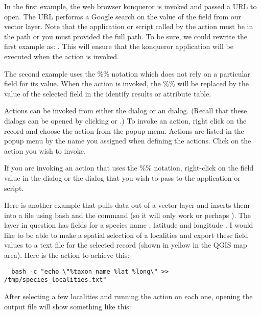 In the first example, the web browser konqueror is invoked and passed a URL to
open. The URL performs a Google search on the value of the  field
from our vector layer. Note that the application or script called by the
action must be in the path or you must provided the full path. To be sure, we could
rewrite the first example as: . This will ensure that the konqueror
application will be executed when the action is invoked.

The second example uses the \%\% notation which does not rely on a particular
field for its value. When the action is invoked, the \%\% will be replaced by
the value of the selected field in the identify results or attribute table.

\label{label_usingactions}

Actions can be invoked from either the  dialog or an
 dialog. (Recall that these dialogs can be opened by
clicking  or
.) To invoke an action,
right click on the record and choose the action from the popup menu. Actions
are listed in the popup menu by the name you assigned when defining the
actions. Click on the action you wish to invoke.

If you are invoking an action that uses the \%\% notation, right-click on the
field value in the  dialog or the
 dialog that you wish to pass to the application or script.

Here is another example that pulls data out of a vector layer and inserts them
into a file using bash and the  command (so it will only work
\nix or perhaps \osx). The layer in question has fields for a species name
, latitude  and longitude
. I would like to be able to
make a spatial selection of a localities and export these field values to a
text file for the selected record (shown in yellow in the QGIS map area). Here is
the action to achieve this:

\begin{verbatim}
  bash -c "echo \"%taxon_name %lat %long\" >> /tmp/species_localities.txt"
\end{verbatim} 

After selecting a few localities and running the action on each one, opening
the output file will show something like this:

